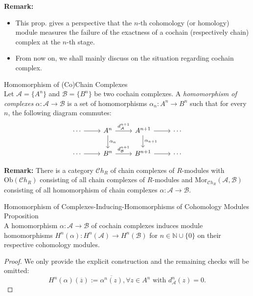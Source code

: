 \noindent\textbf{Remark:} \begin{itemize}
    \item This prop. gives a perspective that the $n$-th cohomology (or homology) module measures the failure of the exactness of a cochain (respectively chain) complex at the $n$-th stage.

    \item From now on, we shall mainly discuss on the situation regarding cochain complex.
\end{itemize}

\begin{definition}{Homomorphism of (Co)Chain Complexes}\\
Let $\mathcal{A}=\{ A^n\}$ and $\mathcal{B}= \{B^n\}$ be two cochain complexes. A \textit{homomorphism of complexes} $\alpha: \mathcal{A} \to \mathcal{B}$ is a set of homomorphisms $\alpha_n: A^n \to B^n$ such that for every $n$, the following diagram commutes:
\[
\begin{tikzcd}
\cdots \arrow[r] & A^n \arrow[r, "d^{n+1}_{\mathcal{A}}"] \arrow[d, "\alpha_n"] & A^{n+1} \arrow[r] \arrow[d, "\alpha_{n+1}"] & \cdots \\
\cdots \arrow[r] & B^n \arrow[r, "d^{n+1}_{\mathcal{B}}"]                    & B^{n+1} \arrow[r]                   & \cdots
\end{tikzcd}
\]
\end{definition}

\noindent\textbf{Remark:} There is a category $\mathcal{C}h_R$ of chain complexes of $R$-modules with $\text{Ob} (\mathcal{C}h_R)$ consisting of all chain complexes of $R$-modules and $\text{Mor}_{\mathcal{C}h_R} (\mathcal{A},\mathcal{B})$ consisting of all homomorphism of chain complexes $\alpha: \mathcal{A} \to \mathcal{B}$.


\begin{proposition}{Homomorphism of Complexes-Inducing-Homomorphisms of Cohomology Modules Proposition}\\
A homomorphism $\alpha: \mathcal{A} \to \mathcal{B}$ of cochain complexes induces module homomorphisms $H^n(\alpha): H^n(\mathcal{A}) \to H^n(\mathcal{B})$ for $n \in \mathbb{N} \cup \{0\}$ on their respective cohomology modules. 
\end{proposition}


\begin{proof}
    We only provide the explicit construction and the remaining checks will be omitted:
    \[
    H^n(\alpha) (\overline{z}) := \overline{\alpha^n (z)} ,\forall z\in A^n \text{ with } d^n_{\mathcal{A}} (z)=0.
    \]
\end{proof}

